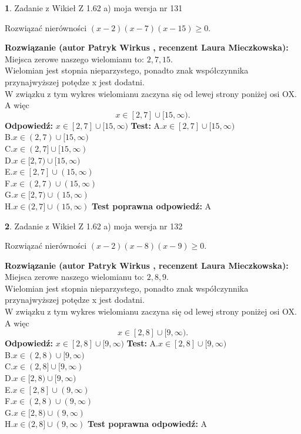 \documentclass[12pt, a4paper]{article}
\theoremstyle{definition} %
\newtheorem{zad}{}
\newcommand{\zadStart}[1]{\begin{zad}#1\newline}
\newcommand{\zadStop}{\end{zad}}
\newcommand{\rozwStart}[2]{\noindent \textbf{Rozwiązanie (autor #1 , recenzent #2): }\newline}
\newcommand{\rozwStop}{\newline}
\newcommand{\odpStart}{\noindent \textbf{Odpowiedź:}\newline}
\newcommand{\odpStop}{\newline}
\newcommand{\testStart}{\noindent \textbf{Test:}\newline}
\newcommand{\testStop}{\newline}
\newcommand{\kluczStart}{\noindent \textbf{Test poprawna odpowiedź:}\newline}
\newcommand{\kluczStop}{\newline}
\begin{document}
\zadStart{Zadanie z Wikieł Z 1.62 a) moja wersja nr 131}

Rozwiązać nierówności $(x-2)(x-7)(x-15)\ge0$.
\zadStop
\rozwStart{Patryk Wirkus}{Laura Mieczkowska}
Miejsca zerowe naszego wielomianu to: $2, 7, 15$.\\
Wielomian jest stopnia nieparzystego, ponadto znak współczynnika przy\linebreak najwyższej potędze x jest dodatni.\\ W związku z tym wykres wielomianu zaczyna się od lewej strony poniżej osi OX. A więc $$x \in [2,7] \cup [15,\infty).$$
\rozwStop
\odpStart
$x \in [2,7] \cup [15,\infty)$
\odpStop
\testStart
A.$x \in [2,7] \cup [15,\infty)$\\
B.$x \in (2,7) \cup [15,\infty)$\\
C.$x \in (2,7] \cup [15,\infty)$\\
D.$x \in [2,7) \cup [15,\infty)$\\
E.$x \in [2,7] \cup (15,\infty)$\\
F.$x \in (2,7) \cup (15,\infty)$\\
G.$x \in [2,7) \cup (15,\infty)$\\
H.$x \in (2,7] \cup (15,\infty)$
\testStop
\kluczStart
A
\kluczStop



\zadStart{Zadanie z Wikieł Z 1.62 a) moja wersja nr 132}

Rozwiązać nierówności $(x-2)(x-8)(x-9)\ge0$.
\zadStop
\rozwStart{Patryk Wirkus}{Laura Mieczkowska}
Miejsca zerowe naszego wielomianu to: $2, 8, 9$.\\
Wielomian jest stopnia nieparzystego, ponadto znak współczynnika przy\linebreak najwyższej potędze x jest dodatni.\\ W związku z tym wykres wielomianu zaczyna się od lewej strony poniżej osi OX. A więc $$x \in [2,8] \cup [9,\infty).$$
\rozwStop
\odpStart
$x \in [2,8] \cup [9,\infty)$
\odpStop
\testStart
A.$x \in [2,8] \cup [9,\infty)$\\
B.$x \in (2,8) \cup [9,\infty)$\\
C.$x \in (2,8] \cup [9,\infty)$\\
D.$x \in [2,8) \cup [9,\infty)$\\
E.$x \in [2,8] \cup (9,\infty)$\\
F.$x \in (2,8) \cup (9,\infty)$\\
G.$x \in [2,8) \cup (9,\infty)$\\
H.$x \in (2,8] \cup (9,\infty)$
\testStop
\kluczStart
A
\kluczStop
\end{document}
